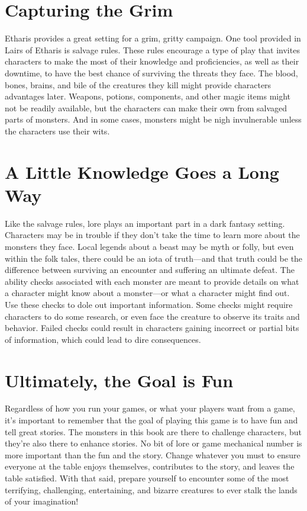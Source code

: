 \documentclass[10pt,a4paper,twoside,twocolumn,openany,bg=print,nodeprecatedcode]{dndbook}
\begin{document}
\section{Capturing the Grim}
Etharis provides a great setting for a grim, gritty campaign. One tool provided in Lairs of Etharis is salvage rules. These rules encourage a type of play that invites characters to make the most of their knowledge and proficiencies, as well as their downtime, to have the best chance of surviving the threats they face. The blood, bones, brains, and bile of the creatures they kill might provide characters advantages later. Weapons, potions, components, and other magic items might not be readily available, but the characters can make their own from salvaged parts of monsters. And in some cases, monsters might be nigh invulnerable unless the characters use their wits.
\section{A Little Knowledge Goes a Long Way}
Like the salvage rules, lore plays an important part in a dark fantasy setting. Characters may be in trouble if they don't take the time to learn more about the monsters they face. Local legends about a beast may be myth or folly, but even within the folk tales, there could be an iota of truth—and that truth could be the difference between surviving an encounter and suffering an ultimate defeat.
The ability checks associated with each monster are meant to provide details on what a character might know about a monster—or what a character might find out. Use these checks to dole out important information. Some checks might require characters to do some research, or even face the creature to observe its traits and behavior. Failed checks could result in characters gaining incorrect or partial bits of information, which could lead to dire consequences.
\section{Ultimately, the Goal is Fun}
Regardless of how you run your games, or what your players want from a game, it's important to remember that the goal of playing this game is to have fun and tell great stories. The monsters in this book are there to challenge characters, but they're also there to enhance stories. No bit of lore or game mechanical number is more important than the fun and the story. Change whatever you must to ensure everyone at the table enjoys themselves, contributes to the story, and leaves the table satisfied.
With that said, prepare yourself to encounter some of the most terrifying, challenging, entertaining, and bizarre creatures to ever stalk the lands of your imagination!
\end{document}

